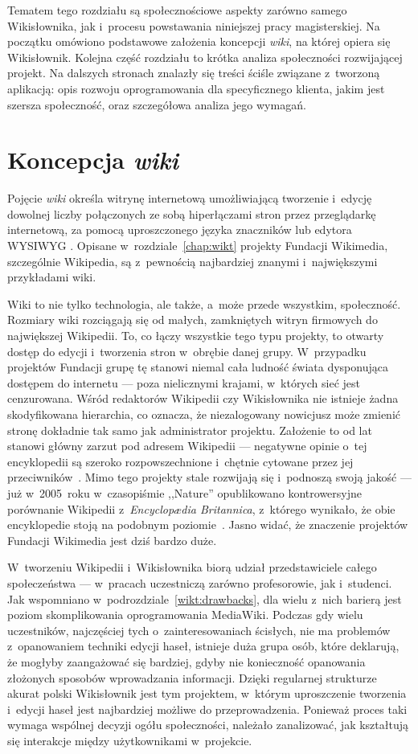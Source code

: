 Tematem tego rozdziału są społecznościowe aspekty zarówno samego Wikisłownika, jak i~procesu powstawania niniejszej pracy magisterskiej. Na początku omówiono podstawowe założenia koncepcji \emph{wiki}, na której opiera się Wikisłownik. Kolejna część rozdziału to krótka analiza społeczności rozwijającej projekt. Na dalszych stronach znalazły się treści ściśle związane z~tworzoną aplikacją: opis rozwoju oprogramowania dla specyficznego klienta, jakim jest szersza społeczność, oraz szczegółowa analiza jego wymagań.

\section{Koncepcja \emph{wiki}}
Pojęcie \emph{wiki} określa witrynę internetową umożliwiającą tworzenie i~edycję dowolnej liczby połączonych ze sobą hiperłączami stron przez przeglądarkę internetową, za pomocą uproszczonego języka znaczników lub edytora WYSIWYG \cite{britannica}. Opisane w~rozdziale~\ref{chap:wikt} projekty Fundacji Wikimedia, szczególnie Wikipedia, są z~pewnością najbardziej znanymi i~największymi przykładami wiki.

Wiki to nie tylko technologia, ale także, a~może przede wszystkim, społeczność. Rozmiary wiki rozciągają się od małych, zamkniętych witryn firmowych do największej Wikipedii. To, co łączy wszystkie tego typu projekty, to otwarty dostęp do edycji i~tworzenia stron w~obrębie danej grupy. W~przypadku projektów Fundacji grupę tę stanowi niemal cała ludność świata dysponująca dostępem do internetu --- poza nielicznymi krajami, w~których sieć jest cenzurowana. Wśród redaktorów Wikipedii czy Wikisłownika nie istnieje żadna skodyfikowana hierarchia, co oznacza, że niezalogowany nowicjusz może zmienić stronę dokładnie tak samo jak administrator projektu. Założenie to od lat stanowi główny zarzut pod adresem Wikipedii --- negatywne opinie o~tej encyklopedii są szeroko rozpowszechnione i~chętnie cytowane przez jej przeciwników~\cite{knol}. Mimo tego projekty stale rozwijają się i~podnoszą swoją jakość --- już w~2005~roku w~czasopiśmie ,,Nature'' opublikowano kontrowersyjne porównanie Wikipedii z~\emph{Encyclopædia Britannica}, z~którego wynikało, że obie encyklopedie stoją na podobnym poziomie~\cite{nature:britannica}. Jasno widać, że znaczenie projektów Fundacji Wikimedia jest dziś bardzo duże.

W~tworzeniu Wikipedii i~Wikisłownika biorą udział przedstawiciele całego społeczeństwa --- w~pracach uczestniczą zarówno profesorowie, jak i~studenci. Jak wspomniano w~podrozdziale~\ref{wikt:drawbacks}, dla wielu z~nich barierą jest poziom skomplikowania oprogramowania MediaWiki. Podczas gdy wielu uczestników, najczęściej tych o~zainteresowaniach ścisłych, nie ma problemów z~opanowaniem techniki edycji haseł, istnieje duża grupa osób, które deklarują, że mogłyby zaangażować się bardziej, gdyby nie konieczność opanowania złożonych sposobów wprowadzania informacji. Dzięki regularnej strukturze akurat polski Wikisłownik jest tym projektem, w~którym uproszczenie tworzenia i~edycji haseł jest najbardziej możliwe do przeprowadzenia. Ponieważ proces taki wymaga wspólnej decyzji ogółu społeczności, należało zanalizować, jak kształtują się interakcje między użytkownikami w~projekcie.

